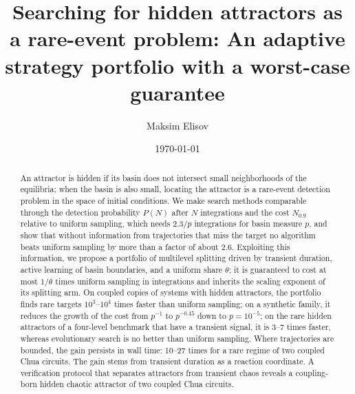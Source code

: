 \title[Hidden attractors as a rare-event problem]{Searching for hidden attractors as a rare-event problem: An adaptive strategy portfolio with a worst-case guarantee}

\author{Maksim Elisov}

\date{\today}

\begin{abstract}
An attractor is hidden if its basin does not intersect small neighborhoods of the equilibria; when the basin is also small, locating the attractor is a rare-event detection problem in the space of initial conditions. We make search methods comparable through the detection probability $P(N)$ after $N$ integrations and the cost $N_{0.9}$ relative to uniform sampling, which needs $2.3/p$ integrations for basin measure $p$, and show that without information from trajectories that miss the target no algorithm beats uniform sampling by more than a factor of about 2.6. Exploiting this information, we propose a portfolio of multilevel splitting driven by transient duration, active learning of basin boundaries, and a uniform share $\theta$; it is guaranteed to cost at most $1/\theta$ times uniform sampling in integrations and inherits the scaling exponent of its splitting arm. On coupled copies of systems with hidden attractors, the portfolio finds rare targets $10^3$--$10^4$ times faster than uniform sampling; on a synthetic family, it reduces the growth of the cost from $p^{-1}$ to $p^{-0.45}$ down to $p=10^{-5}$; on the rare hidden attractors of a four-level benchmark that have a transient signal, it is 3--7 times faster, whereas evolutionary search is no better than uniform sampling. Where trajectories are bounded, the gain persists in wall time: 10--27 times for a rare regime of two coupled Chua circuits. The gain stems from transient duration as a reaction coordinate. A verification protocol that separates attractors from transient chaos reveals a coupling-born hidden chaotic attractor of two coupled Chua circuits.
\end{abstract}

\maketitle

